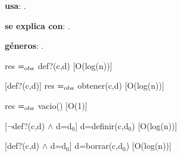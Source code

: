 \begin{Interfaz}
  
  \textbf{usa}: \tadNombre{}.
  
  \textbf{se explica con}: .

  \textbf{g\'eneros}: .


  {res $=_{\mathrm{obs}}$ def?(c,d)}%
  [O(log(n))]

  [def?(c,d)]
  {res $=_{\mathrm{obs}}$ obtener(c,d)}%
  [O(log(n))]
  
  {res $=_{\mathrm{obs}}$ vacio()}%
  [O(1)]
  
  [$\neg$def?(c,d) $\wedge$ d=d$_0$]
  {d=definir(c,d$_0$)}%
  [O(log(n))]
  
  [def?(c,d) $\wedge$ d=d$_0$]
  {d=borrar(c,d$_0$)}%
  [O(log(n))]

\end{Interfaz}

